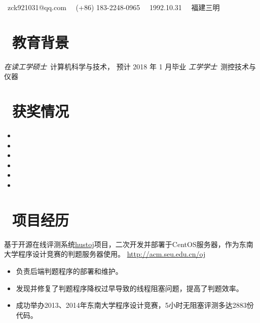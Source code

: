 \documentclass{resume}
\begin{document}

\centerline{\sffamily\large{\faEnvelope\ {zck921031@qq.com} \textperiodcentered\ \faPhone\ {(+86) 183-2248-0965} \textperiodcentered\ \faBirthdayCake\ {1992.10.31} \textperiodcentered\ \faHome\ {福建三明}}
	\vspace{1.5ex} }
 
\section{\faGraduationCap\  教育背景}
\textit{在读工学硕士}\ 计算机科学与技术， 预计 2018 年 1 月毕业
\textit{工学学士}\ 测控技术与仪器

\section{\faHeartO\ 获奖情况}
\begin{itemize}[parsep=0.5ex]
	\item {}
	\item {}
	\item {}
	\item {}
	\item {}
	\item {}
\end{itemize}

\section{\faUsers\ 项目经历}
\begin{onehalfspacing}
基于开源在线评测系统\href{https://github.com/zhblue/hustoj}{hustoj}项目，二次开发并部署于CentOS服务器，作为东南大学程序设计竞赛的判题服务器使用。
 \href{http://acm.seu.edu.cn/oj/}{http://acm.seu.edu.cn/oj}
\begin{itemize}
  \item 负责后端判题程序的部署和维护。
  \item 发现并修复了判题程序降权过早导致的线程阻塞问题，提高了判题效率。
  \item 成功举办2013、2014年东南大学程序设计竞赛，5小时无阻塞评测多达2883份代码。
\end{itemize}
\end{onehalfspacing}
\end{document}
